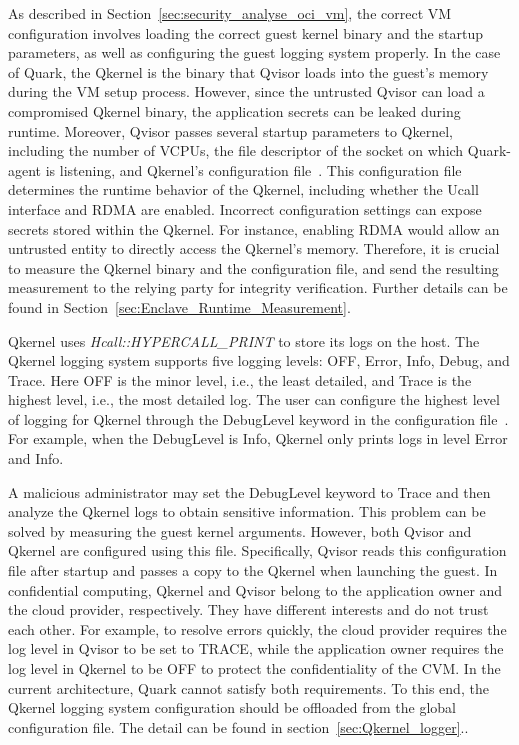 As described in Section~\ref{sec:security_analyse_oci_vm}, the correct VM configuration involves loading the correct guest kernel binary and the startup parameters, as well as configuring the guest logging system properly. In the case of Quark, the Qkernel is the binary that Qvisor loads into the guest's memory during the VM setup process. However, 
since the untrusted Qvisor can load a compromised Qkernel binary, the application secrets can be leaked during runtime. Moreover, Qvisor passes several startup parameters to Qkernel, including the number of VCPUs, the file descriptor of the socket on which Quark-agent is listening, and Qkernel's configuration file~\cite*{quark_conf_file}. This configuration file 
determines the runtime behavior of the Qkernel, including whether the Ucall interface and RDMA are enabled. Incorrect configuration settings can expose secrets stored within the Qkernel. For instance, enabling RDMA would allow an untrusted entity to directly access the Qkernel's memory. Therefore, it is crucial to measure the Qkernel binary and the configuration 
file, and send the resulting measurement to the relying party for integrity verification. Further details can be found in Section~\ref{sec:Enclave_Runtime_Measurement}.

Qkernel uses \emph{Hcall::HYPERCALL\_PRINT} to store its logs on the host. The Qkernel logging system supports five logging levels: OFF, Error, Info, Debug, and Trace. Here OFF is the minor level, i.e., the least detailed, and Trace is the highest level, i.e., the most detailed log. The user can configure the highest level of logging for Qkernel through the 
DebugLevel keyword in the configuration file~\cite*{quark_conf_file}. For example, when the DebugLevel is Info, Qkernel only prints logs in level Error and Info.

A malicious administrator may set the DebugLevel keyword to Trace and then analyze the Qkernel logs to obtain sensitive information. This problem can be solved by measuring the guest kernel arguments. However, both Qvisor and Qkernel are configured using this file. Specifically, Qvisor reads this configuration file after startup and passes a copy to the 
Qkernel when launching the guest. In confidential computing, Qkernel and Qvisor belong to the application owner and the cloud provider, respectively. They have different interests and do not trust each other. For example, to resolve errors quickly, the cloud provider requires the log level in Qvisor to be set to TRACE, while the application owner requires the 
log level in Qkernel to be OFF to protect the confidentiality of the CVM. In the current architecture, Quark cannot satisfy both requirements. To this end, the Qkernel logging system configuration should be offloaded from the global configuration file. The detail can be found in section~\ref{sec:Qkernel_logger}..


